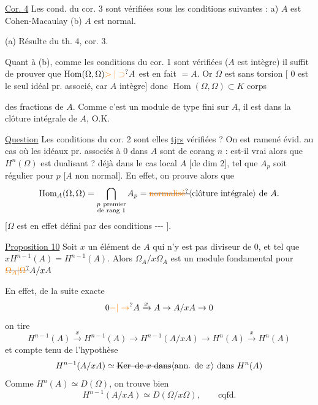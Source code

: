 \uline{Cor. 4} Les cond. du cor. 3 sont vérifiées
sous les conditions suivantes : a) $A$ est
Cohen-Macaulay \qquad (b) $A$ est normal.

 (a) Résulte du th. 4, cor. 3.

Quant à (b), comme les conditions du cor. 1
sont vérifiées ($A$ est intègre) il suffit
de prouver que $\operatorname{Hom}(\Omega,\Omega)\unsure{>|\supset} A$ est en
fait $=A$. Or $\Omega$ est sans torsion
[ $0$ est le seul idéal pr. associé,
car $A$ intègre] donc $\operatorname{Hom}(\Omega,\Omega)\subset K$ corps

des fractions de $A$. Comme c'est un module de
type fini sur $A$, il est dans la clôture
intégrale de $A$, O.K.

\uline{Question} Les conditions du cor. 2 sont elles
\uline{tjrs} vérifiées ? On est ramené évid. au cas
où les idéaux pr. associés à $0$ dans $A$
sont de  corang $n$ : est-il vrai alors
que $H^n(\Omega)$ est dualisant ?  déjà
dans le cas  
local  $A$ [de dim 2], tel que $A_p$ soit
régulier pour $p$  [$A$ non normal]. En
effet,  on prouve alors que
\[
\operatorname{Hom}_A(\Omega,\Omega)=\bigcap_{\substack{p\ \text{premier}\\\text{de rang }1}}A_p
=\deleted{\text{\unsure{normalisé}}}\inserted{\text{clôture intégrale}}\text{ de }A .
\]
[$\Omega$ est en effet défini par des conditions 
\mbox{-{}-{}-} ].

\uline{Proposition 10} Soit $x$ un élément de $A$ qui
n'y est pas diviseur de $0$, et tel que
$xH^{n-1}(A)=H^{n-1}(A)$. Alors $\Omega_A/x\Omega_A$ est
un module fondamental pour $\deleted{\unsure{\Omega_A|\Omega}}A/xA$

En effet, de la suite exacte
\[
0\unsure{-|\to} A\xrightarrow{x}A\to A/xA\to0
\]
on tire
\[
H^{n-1}(A)\xrightarrow{x}H^{n-1}(A)\to H^{n-1}(A/xA)\to H^n(A)\xrightarrow{x}H^n(A)
\]
et compte tenu de l'hypothèse
\[
H^{n-1}(A/xA)\simeq\deleted{\operatorname{Ker}\text{ de }x\text{ dans}}\inserted{\text{ann. de }x}\text{ dans }H^n(A)
\]
Comme $H^n(A)\simeq D(\Omega)$, on trouve bien
\[
H^{n-1}(A/xA)\simeq D(\Omega/x\Omega),\qquad\text{cqfd.}
\]

